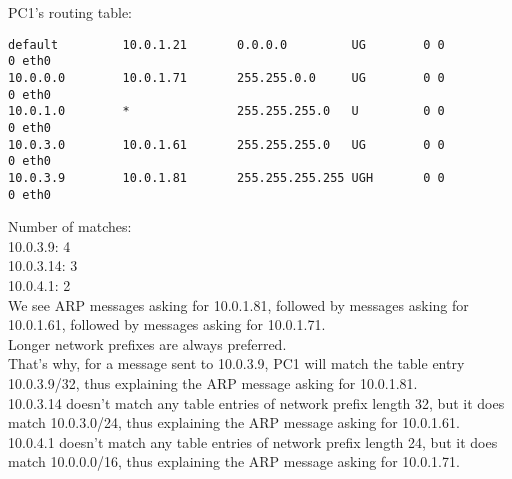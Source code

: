 PC1's routing table:
\begin{lstlisting}
default         10.0.1.21       0.0.0.0         UG        0 0          0 eth0
10.0.0.0        10.0.1.71       255.255.0.0     UG        0 0          0 eth0
10.0.1.0        *               255.255.255.0   U         0 0          0 eth0
10.0.3.0        10.0.1.61       255.255.255.0   UG        0 0          0 eth0
10.0.3.9        10.0.1.81       255.255.255.255 UGH       0 0          0 eth0
\end{lstlisting}
Number of matches:\\
10.0.3.9: 4\\
10.0.3.14: 3\\
10.0.4.1: 2\\

We see ARP messages asking for 10.0.1.81, followed by messages asking for 10.0.1.61, followed by messages asking for 10.0.1.71.\\

Longer network prefixes are always preferred. \\
That's why, for a message sent to 10.0.3.9, PC1 will match the table entry 10.0.3.9/32, thus explaining the ARP message asking for 10.0.1.81.\\
10.0.3.14 doesn't match any table entries of network prefix length 32, but it does match 10.0.3.0/24, thus explaining the ARP message asking for 10.0.1.61.\\
10.0.4.1 doesn't match any table entries of network prefix length 24, but it does match 10.0.0.0/16, thus explaining the ARP message asking for 10.0.1.71.\\
